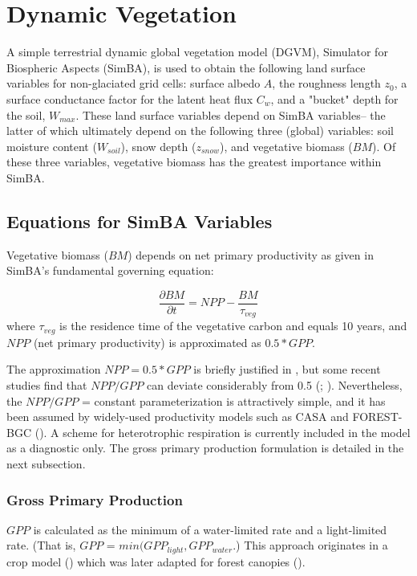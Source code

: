 \chapter{Dynamic Vegetation}\label{dynveg}
A simple terrestrial dynamic global vegetation model (DGVM), Simulator
for Biospheric Aspects (SimBA), is used to obtain the following land
surface variables for non-glaciated grid cells: surface albedo $A$,
the roughness length $z_{0}$, a surface conductance factor for the
latent heat flux $C_{w}$, and a "bucket" depth for the soil, $W_{max}$.
These land surface variables depend on SimBA variables-- the latter of
which ultimately depend on the following three  (global) variables:
soil moisture content ($W_{soil}$), snow depth ($z_{snow}$), and
vegetative biomass ($BM$).  Of these three variables, vegetative
biomass has the greatest importance within SimBA.

\section{Equations for SimBA Variables}
Vegetative biomass ($BM$) depends on net primary productivity as given in SimBA's fundamental governing equation:

\begin{equation}
\label{eq:dBMdt} 
\frac{\partial BM}{\partial t} = NPP - \frac{BM}{\tau_{veg}}
\end{equation}
where $\tau_{veg}$ is the residence time of the vegetative carbon and equals 10 years, and $NPP$ (net primary productivity) is approximated as $0.5 * GPP$.  

The approximation $NPP = 0.5 * GPP$ is briefly justified in \cite{kleidon2006}, but  some recent studies find that $NPP/GPP$ can deviate considerably from 0.5 (\cite{delucia2007}; \cite{zhang2009}).  Nevertheless, the $NPP/GPP$ = constant parameterization is attractively simple, and it has been assumed by widely-used productivity models such as CASA and FOREST-BGC (\cite{delucia2007}).  A scheme for heterotrophic respiration is currently included in the model as a diagnostic only.  The gross primary production formulation is detailed in the next subsection.

\subsection{Gross Primary Production}

$GPP$ is calculated as the minimum of a water-limited rate and a light-limited rate.  (That is, $GPP$ = $min(GPP_{light},GPP_{water}$.)  This approach originates in a crop model (\cite{monteith1989}) which was later adapted for forest canopies (\cite{dewar1997}).  

